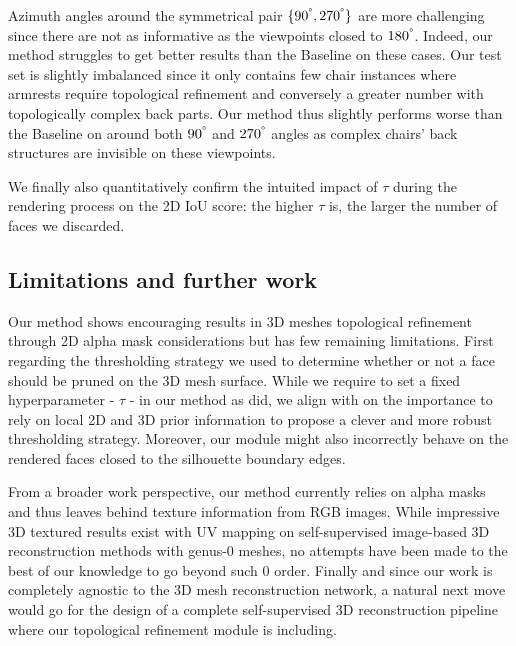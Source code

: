 Azimuth angles around the symmetrical pair $\{90^{\degree}, 270^{\degree}\}$ are more challenging since there are not as informative as the viewpoints closed to $180^{\degree}$. Indeed, our method struggles to get better results than the Baseline on these cases. Our test set is slightly imbalanced since it only contains few chair instances where armrests require topological refinement and conversely a greater number with topologically complex back parts. Our method thus slightly performs worse than the Baseline on around both $90^{\degree}$ and $270^{\degree}$ angles as complex chairs' back structures are invisible on these viewpoints. 

We finally also quantitatively confirm the intuited impact of $\tau$ during the rendering process on the 2D IoU score: the higher $\tau$ is, the larger the number of faces we discarded. 


\subsection{Limitations and further work}



Our method shows encouraging results in 3D meshes topological refinement through 2D alpha mask considerations but has few remaining limitations. First regarding the thresholding strategy we used to determine whether or not a face should be pruned on the 3D mesh surface. While we require to set a fixed hyperparameter - $\tau$ - in our method as \citep{pan2019deep} did, we align with \citep{nie2020total3dunderstanding} on the importance to rely on local 2D and 3D prior information to propose a clever and more robust thresholding strategy. Moreover, our module might also incorrectly behave on the rendered faces closed to the silhouette boundary edges. 

From a broader work perspective, our method currently relies on alpha masks and thus leaves behind texture information from RGB images. While impressive 3D textured results exist with UV mapping on self-supervised image-based 3D reconstruction methods with genus-0 meshes\citep{li2020self,pavllo2020convolutional}, no attempts have been made to the best of our knowledge to go beyond such 0 order. Finally and since our work is completely agnostic to the 3D mesh reconstruction network, a natural next move would go for the design of a complete self-supervised 3D reconstruction pipeline where our topological refinement module is including. 

